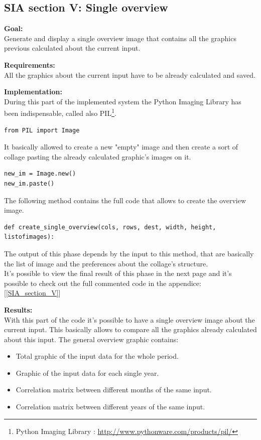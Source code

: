 \newpage
\subsection{SIA section V: Single overview}

\textbf{Goal:}\\
Generate and display a single overview image that contains all the graphics previous calculated about the current input.

\textbf{Requirements:}\\
All the graphics about the current input have to be already calculated and saved.

\textbf{Implementation:}\\
During this part of the implemented system the Python Imaging Library has been indispensable, called also PIL\footnote{Python Imaging Library : \url{http://www.pythonware.com/products/pil/}}. 
\begin{lstlisting}
from PIL import Image
\end{lstlisting}

It basically allowed to create a new "empty" image and then create a sort of collage pasting the already calculated graphic's images on it.
\begin{lstlisting}
new_im = Image.new()
new_im.paste()
\end{lstlisting}

The following method contains the full code that allows to create the overview image. 
\begin{lstlisting}
def create_single_overview(cols, rows, dest, width, height, listofimages):
\end{lstlisting}
The output of this phase depends by the input to this method, that are basically the list of image and the preferences about the collage's structure.\\
It's possible to view the final result of this phase in the next page and it's possible to check out the full commented code in the appendice: [\ref{SIA_section_V}]

\newpage

\textbf{Results:}\\
With this part of the code it's possible to have a single overview image about the current input. This basically allows to compare all the graphics already calculated about this input. The general overview graphic contains:
\begin{itemize}
\item Total graphic of the input data for the whole period.
\item Graphic of the input data for each single year.
\item Correlation matrix between different months of the same input.
\item Correlation matrix between different years of the same input.
\end{itemize}

